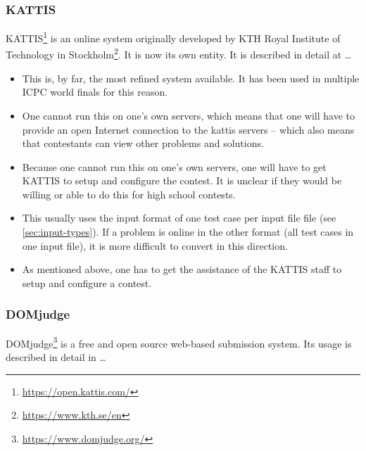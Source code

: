 \documentclass[11pt,twoside,letterpaper]{book}
\newcommand{\footurl}[1]{\footnote{\scriptsize\url{#1}}}
\providecommand{\tightlist}{%
  \setlength{\itemsep}{0pt}\setlength{\parskip}{0pt}}
\begin{document}
\subsubsection{KATTIS}

KATTIS\footurl{https://open.kattis.com/} is an online system
originally developed by KTH Royal Institute of Technology in
Stockholm\footurl{https://www.kth.se/en}.  It is now its own entity.
It is described in detail at \ldots


\begin{itemize}
  \tightlist
\item This is, by far, the most refined system available.  It has been
  used in multiple ICPC world finals for this reason.
\end{itemize}


\begin{itemize}
  \tightlist
\item One cannot run this on one's own servers, which means that one
    will have to provide an open Internet connection to the kattis
    servers -- which also means that contestants can view other
    problems and solutions.
\item Because one cannot run this on one's own servers, one will
    have to get KATTIS to setup and configure the contest.  It is
    unclear if they would be willing or able to do this for high
    school contests.
  \item This usually uses the input format of one test case per input
    file file (see \ref{sec:input-types}).  If a problem is online in
    the other format (all test cases in one input file), it is more
    difficult to convert in this direction.
\end{itemize}


\begin{itemize}
  \tightlist
\item As mentioned above, one has to get the assistance of the KATTIS
  staff to setup and configure a contest.
  \end{itemize}


\subsubsection{DOMjudge}

DOMjudge\footurl{https://www.domjudge.org/} is a free and open source
web-based submission system.  Its usage is described in detail in
\ldots
\end{document}
